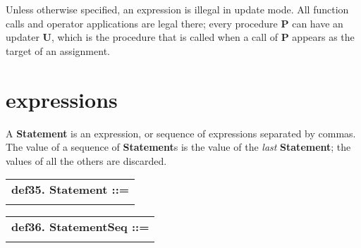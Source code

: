 \documentclass{report}
\begin{document}
Unless otherwise specified, an expression is illegal in update mode.
All function calls and operator applications are legal there; every
procedure {\bf P} can have an updater {\bf U}, which is the procedure that is
called when a call of {\bf P} appears as the target of an assignment.

\section{expressions}


A {\bf Statement} is an expression, or sequence of expressions separated
by commas. The value of a sequence of {\bf Statement}s is the value of the
{\em last} {\bf Statement}; the values of all the others are discarded.

\begin{tabular}{l}
{\bf def35. Statement ::= }\\ 
\hspace*{3mm}{\tt Expr++ "," SEMI} \\ 
\end{tabular}

\begin{tabular}{l}
{\bf def36. StatementSeq ::= }\\ 
\hspace*{3mm}{\tt Statement*} \\ 
\end{tabular}
\end{document}
